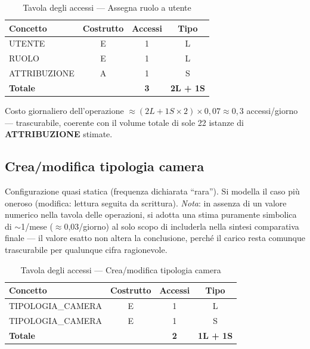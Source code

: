 \documentclass[a4paper,12pt]{report}
\begin{document}
\begin{table}[H]
    \centering
    \begin{tabular}{|l|c|c|c|}
        \hline
        \rowcolor{headerblue}
        \textbf{Concetto} & \textbf{Costrutto} & \textbf{Accessi} & \textbf{Tipo}    \\
        \hline
        UTENTE            & E                  & 1                & L                \\
        RUOLO             & E                  & 1                & L                \\
        ATTRIBUZIONE      & A                  & 1                & S                \\
        \hline
        \rowcolor{gray!25}
        \textbf{Totale}   &                    & \textbf{3}       & \textbf{2L + 1S} \\
        \hline
    \end{tabular}
    \caption{Tavola degli accessi --- Assegna ruolo a utente}
\end{table}

Costo giornaliero dell'operazione $\approx (2L + 1S{\times}2) \times
    0{,}07 \approx 0{,}3$ accessi/giorno --- trascurabile, coerente con il
volume totale di sole 22 istanze di \textbf{ATTRIBUZIONE} stimate.

\newpage

\subsection{Crea/modifica tipologia camera}
\label{sec:TipologiaCameraOp}

Configurazione quasi statica (frequenza dichiarata ``rara''). Si
modella il caso più oneroso (modifica: lettura seguita da scrittura).
\smallskip
\newline
\textit{Nota}: in assenza di un valore numerico nella tavola delle
operazioni, si adotta una stima puramente simbolica di
$\sim$1/mese ($\approx$0,03/giorno) al solo scopo di includerla nella
sintesi comparativa finale --- il valore esatto non altera la
conclusione, perché il carico resta comunque trascurabile per qualunque
cifra ragionevole.

\begin{table}[H]
    \centering
    \begin{tabular}{|l|c|c|c|}
        \hline
        \rowcolor{headerblue}
        \textbf{Concetto} & \textbf{Costrutto} & \textbf{Accessi} & \textbf{Tipo}    \\
        \hline
        TIPOLOGIA\_CAMERA & E                  & 1                & L                \\
        TIPOLOGIA\_CAMERA & E                  & 1                & S                \\
        \hline
        \rowcolor{gray!25}
        \textbf{Totale}   &                    & \textbf{2}       & \textbf{1L + 1S} \\
        \hline
    \end{tabular}
    \caption{Tavola degli accessi --- Crea/modifica tipologia camera}
\end{table}
\end{document}
